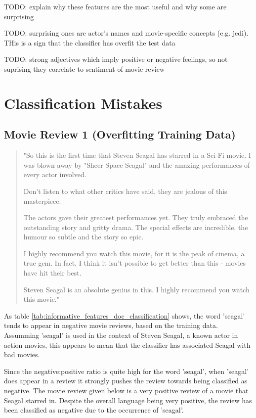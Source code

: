 \documentclass{article}
\begin{document}
TODO: explain why these features are the most useful and why some are surprising

TODO: surprising ones are actor's names and movie-specific concepts (e.g. jedi). THis is a sign that the classifier has overfit the test data

TODO: strong adjectives which imply positive or negative feelings, so not suprising they correlate to sentiment of movie review

\section {Classification Mistakes}

\subsection{Movie Review 1 (Overfitting Training Data)}

\begin{quote}
"So this is the first time that Steven Seagal has starred in a Sci-Fi movie. I was blown away by "Sheer Space Seagal" and the amazing performances of every actor involved.

Don't listen to what other critics have said, they are jealous of this masterpiece.

The actors gave their greatest performances yet. They truly embraced the outstanding story and gritty drama. The special effects are incredible, the humour so subtle and the story so epic.

I highly recommend you watch this movie, for it is the peak of cinema, a true gem. In fact, I think it isn't possible to get better than this - movies have hit their best.

Steven Seagal is an absolute genius in this. I highly recommend you watch this movie."
\end{quote}

As table \ref{tab:informative_features_doc_classification} shows, the word 'seagal' tends to appear in negative movie reviews, based on the training data. Assumming 'seagal' is used in the context of Steven Seagal, a known actor in action movies, this appears to mean that the classifier has associated Seagal with bad movies.

Since the negative:positive ratio is quite high for the word 'seagal', when 'seagal' does appear in a review it strongly pushes the review towards being classified as negative. The movie review given below is a very positive review of a movie that Seagal starred in. Despite the overall language being very positive, the review has been classified as negative due to the occurrence of 'seagal'.
\end{document}
